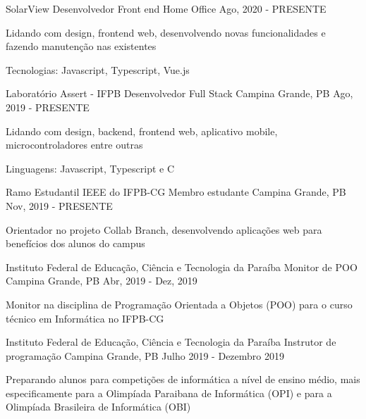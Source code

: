 
\begin{cventries}
  \cventry
    {SolarView} %
    {Desenvolvedor Front end} %
    {Home Office} %
    {Ago, 2020 - PRESENTE} %
    {
      \begin{cvitems} %
        \item {Lidando com design, frontend web, desenvolvendo novas funcionalidades e fazendo manutenção nas existentes}
        \item {Tecnologias: Javascript, Typescript, Vue.js}
      \end{cvitems}
    }

  \cventry
    {Laboratório Assert - IFPB} %
    {Desenvolvedor Full Stack} %
    {Campina Grande, PB} %
    {Ago, 2019 - PRESENTE} %
    {
      \begin{cvitems} %
        \item {Lidando com design, backend, frontend web, aplicativo mobile, microcontroladores entre outras}
        \item {Linguagens: Javascript, Typescript e C}
      \end{cvitems}
    }

  \cventry
    {Ramo Estudantil IEEE do IFPB-CG}
    {Membro estudante}
    {Campina Grande, PB}
    {Nov, 2019 - PRESENTE}
    {
      \begin{cvitems}
        \item {Orientador no projeto Collab Branch, desenvolvendo aplicações web para benefícios dos alunos do campus}
      \end{cvitems}
    }
    
  \cventry
    {Instituto Federal de Educação, Ciência e Tecnologia da Paraíba}
    {Monitor de POO}
    {Campina Grande, PB}
    {Abr, 2019 - Dez, 2019}
    {
      \begin{cvitems}
        \item {Monitor na disciplina de Programação Orientada a Objetos (POO) para o curso técnico em Informática no IFPB-CG}
      \end{cvitems}
    }

  \cventry
    {Instituto Federal de Educação, Ciência e Tecnologia da Paraíba}
    {Instrutor de programação}
    {Campina Grande, PB}
    {Julho 2019 - Dezembro 2019}
    {
      \begin{cvitems}
        \item {Preparando alunos para competições de informática a nível de ensino médio, mais especificamente para a Olimpíada Paraibana de Informática (OPI) e para a Olimpíada Brasileira de Informática (OBI)}
      \end{cvitems}
    }
    
\end{cventries}
